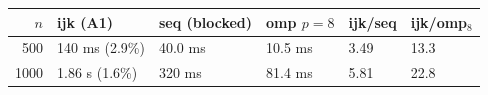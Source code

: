 \begin{tabular}{rlllll}
\toprule
$n$ & ijk (A1) & seq (blocked) & omp $p{=}8$ & ijk/seq & ijk/omp$_8$ \\
\midrule
500 & 140 ms (2.9\%) & 40.0 ms & 10.5 ms & 3.49 & 13.3 \\
1000 & 1.86 s (1.6\%) & 320 ms & 81.4 ms & 5.81 & 22.8 \\
\bottomrule
\end{tabular}
